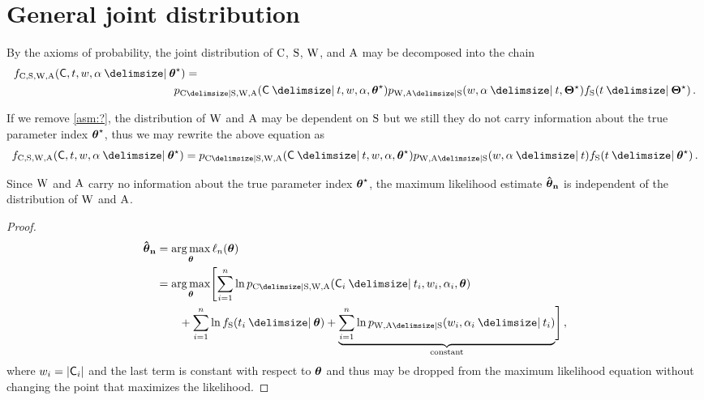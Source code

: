 \documentclass[
    11pt,
    extrafontsizes,
    article,
    oldfontcommands,
    final,
    oneside,
    openany,
    hidelinks]{memoir}
\begin{document}
\chapter{General joint distribution}
\label{appendix:generalized_general_joint_likelihood_cand}
By the axioms of probability, the joint distribution of $\mathrm{C}$, $\mathrm{S}$, $\mathrm{W}$, and $\mathrm{A}$ may be decomposed into the chain
\begin{equation}
\begin{split}
\pdf_{\rvcand, \sv, \RV{W}, \RV{A}}(\cand, t, w, \alpha \Given \tparam\sysparamvec) &=\\ &\!\!\!\!\!\!\pmf_{\rvcand \Given \sv, \RV{W}, \RV{A}}(\cand \Given t, w, \alpha, \tparam\sysparamvec) \pmf_{\RV{W}, \RV{A} \Given \sv}(w, \alpha \Given t, \tparam\sysparam) \spdf(t \Given \tparam\sysparam)\,.
\end{split}
\end{equation}

If we remove \cref{asm:?}, the distribution of $\mathrm{W}$ and $\mathrm{A}$ may be dependent on $\mathrm{S}$ but we still they do not carry information about the true parameter index ${\boldsymbol{\mathbf{\theta}}}^{\star}$, thus we may rewrite the above equation as
\begin{equation}
\pdf_{\rvcand, \sv, \RV{W}, \RV{A}}(\cand, t, w, \alpha \Given \tparam\sysparamvec) = \pmf_{\rvcand \Given \sv, \RV{W}, \RV{A}}(\cand \Given t, w, \alpha, \tparam\sysparamvec) \pmf_{\RV{W}, \RV{A} \Given \sv}(w, \alpha \Given t) \spdf(t \Given \tparam\sysparamvec)\,.
\end{equation}

Since $\mathrm{W}$ and $\mathrm{A}$ carry no information about the true parameter index ${\boldsymbol{\mathbf{\theta}}}^{\star}$, the maximum likelihood estimate $\boldsymbol{\mathbf{\hat{\boldsymbol{\mathbf{\theta}}}_{n}}}$ is independent of the distribution of $\mathrm{W}$ and $\mathrm{A}$.
\begin{proof}
\begin{equation}
\begin{split}
    \mleu &= \argmax_{\sysparamvec}
        \ell_n(\sysparamvec)\\
        &= \argmax_{\sysparamvec} \Biggl[ \sum_{i=1}^{n}
        \ln \pmf_{\rvcand \Given \sv, \RV{W}, \RV{A}}(\cand_i \Given t_i, w_i, \alpha_i, \sysparamvec)\\
        &\qquad+ \sum_{i=1}^{n} \ln \spdf(t_i \Given \sysparamvec) + \underbrace{\sum_{i=1}^{n} \ln \pmf_{\RV{W}, \RV{A} \Given \sv}(w_i, \alpha_i \Given t_i)}_{\text{constant}}\Biggr]\,,
\end{split}
\end{equation}
where $w_i = \Card{\cand_i}$ and the last term is constant with respect to $\boldsymbol{\mathbf{\theta}}$ and thus may be dropped from the maximum likelihood equation without changing the point that maximizes the likelihood.
\end{proof}
\end{document}
